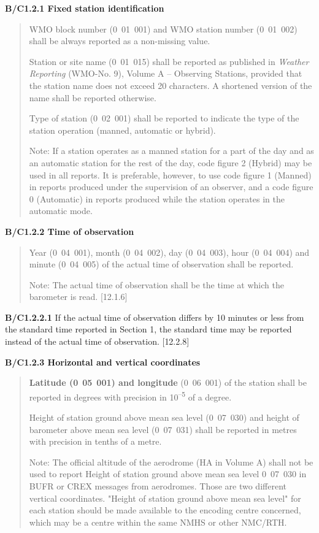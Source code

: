 \textbf{B/C1.2.1 Fixed station identification}

\begin{quote}
WMO block number (0~01~001) and WMO station number (0~01~002) shall be always reported as a non-missing value.

Station or site name (0~01~015) shall be reported as published in \emph{Weather Reporting} (WMO-No. 9), Volume A -- Observing Stations, provided that the station name does not exceed 20 characters. A shortened version of the name shall be reported otherwise.

Type of station (0~02~001) shall be reported to indicate the type of the station operation (manned, automatic or hybrid).

Note: If a station operates as a manned station for a part of the day and as an automatic station for the rest of the day, code figure 2 (Hybrid) may be used in all reports. It is preferable, however, to use code figure 1 (Manned) in reports produced under the supervision of an observer, and a code figure 0 (Automatic) in reports produced while the station operates in the automatic mode.
\end{quote}

\textbf{B/C1.2.2 Time of observation}

\begin{quote}
Year (0~04~001), month (0~04~002), day (0~04~003), hour (0~04~004) and minute (0~04~005) of the actual time of observation shall be reported.

Note: The actual time of observation shall be the time at which the barometer is read. {[}12.1.6{]}
\end{quote}

\textbf{B/C1.2.2.1} If the actual time of observation differs by 10 minutes or less from the standard time reported in Section 1, the standard time may be reported instead of the actual time of observation. {[}12.2.8{]}

\textbf{B/C1.2.3 Horizontal and vertical coordinates}

\begin{quote}
\textbf{Latitude (0}~\textbf{05}~\textbf{001) and longitude} (0~06~001) of the station shall be reported in degrees with precision in 10\textsuperscript{--5} of a degree.

Height of station ground above mean sea level (0~07~030) and height of barometer above mean sea level (0~07~031) shall be reported in metres with precision in tenths of a metre.

Note: The official altitude of the aerodrome (HA in Volume A) shall not be used to report Height of station ground above mean sea level 0~07~030 in BUFR or CREX messages from aerodromes. Those are two different vertical coordinates. "Height of station ground above mean sea level" for each station should be made available to the encoding centre concerned, which may be a centre within the same NMHS or other NMC/RTH.
\end{quote}

